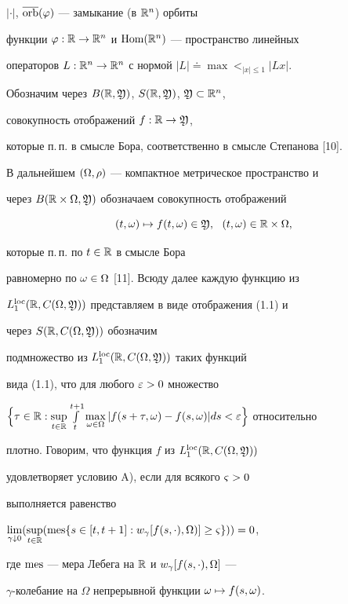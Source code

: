 $|\cdot|$, $\overline{\operatorname{orb}}(\varphi)$ --- замыкание (в $\Bbb R^{n}$) орбиты


функции $\varphi:\Bbb R\to\Bbb R^{n}$ и $\operatorname{Hom}(\Bbb R^{n})$ --- пространство линейных


операторов $L:\Bbb R^{n}\to\Bbb R^{n}$ с нормой $|L|\doteq\max\lt_{|x|\le1}|Lx|$.


Обозначим через $B(\Bbb R,\frak Y)$, $S(\Bbb R,\frak Y)$, $\frak Y\subset \Bbb R^{n}$,


совокупность отображений $f:\Bbb R\to \frak Y$,


которые п.\,п. в смысле Бора, соответственно в смысле Степанова [10].


В дальнейшем $(\Omega,\rho)$ --- компактное метрическое пространство и


через $B(\Bbb R\times\Omega,\frak Y)$ обозначаем совокупность отображений


\begin{equation}


(t,\om)\mapsto f(t,\om)\in\frak Y,\ \ (t,\om)\in\R\times\Om,


\end{equation}


которые п.\,п. по $t\in\Bbb R$ в смысле Бора


равномерно по $\omega\in\Omega$ [11]. Всюду далее каждую функцию из


$L_{1}^{\operatorname{loc}}(\Bbb R,C(\Omega,\frak Y))$ представляем в виде отображения (1.1) и


через $S(\Bbb R,C(\Omega,\frak Y))$ обозначим


подмножество из $L_{1}^{\operatorname{loc}}(\Bbb R,C(\Omega,\frak Y))$ таких функций


вида (1.1), что для любого $\varepsilon>0$ множество


$\Big\{\tau\in\R:\sup\lt_{t\in\R}\int\lt_{t}^{t+1}


\max\lt_{\om\in\Om}|f(s+\tau,\om)-f(s,\om)|ds<\ve\Big\}$ относительно


плотно. Говорим, что функция $f$ из $L_{1}^{\operatorname{loc}}(\Bbb R,C(\Omega,\frak Y))$


удовлетворяет условию A), если для всякого $\varsigma>0$


выполняется равенство


$\lim\lt_{\gamma\downarrow 0}(\sup\lt_{t\in\R}(\mes\{s\in


[t,t+1]:w_{\gamma}[f(s,\cdot),\Om)]\ge\vsg\}))=0$,


где $\operatorname{mes}$ --- мера Лебега на $\Bbb R$ и $w_{\gamma}[f(s,\cdot),\Omega]$ ---


$\gamma$-колебание на $\Omega$ непрерывной функции $\omega\mapsto f(s,\omega)$.






